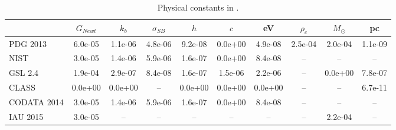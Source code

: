 \begin{table}
  \begin{center}
  \caption{Physical constants in \ccl. \label{tab:constants}}
  \begin{tabular}{lccccccccc}
\hline\hline
 & $G_{Newt}$ & $k_b$ & $\sigma_{SB}$ & $h$ & $c$ & eV & $\rho_c$ & $M_\odot$ & pc \\
\hline
PDG 2013 & 6.0e-05 & 1.1e-06 & 4.8e-06 & 9.2e-08 & 0.0e+00 & 4.9e-08 & 2.5e-04 & 2.0e-04 & 1.1e-09 \\[3pt]
NIST & 3.0e-05 & 1.4e-06 & 5.9e-06 & 1.6e-07 & 0.0e+00 & 8.4e-08 & \--- & \--- & \--- \\[3pt]
GSL 2.4 & 1.9e-04 & 2.9e-07 & 8.4e-08 & 1.6e-07 & 1.5e-06 & 2.2e-06 & \--- & 0.0e+00 & 7.8e-07 \\[3pt]
CLASS & 0.0e+00 & 0.0e+00 & \--- & 0.0e+00 & 0.0e+00 & 0.0e+00 & \--- & \--- & 6.7e-11 \\[3pt]
CODATA 2014 & 3.0e-05 & 1.4e-06 & 5.9e-06 & 1.6e-07 & 0.0e+00 & 8.4e-08 & \--- & \--- & \--- \\[3pt]
IAU 2015 & 3.0e-05 & \--- & \--- & \--- & \--- & \--- & \--- & 2.2e-04 & \--- \\
\hline\hline
\end{tabular}
\end{center}
\end{table}


